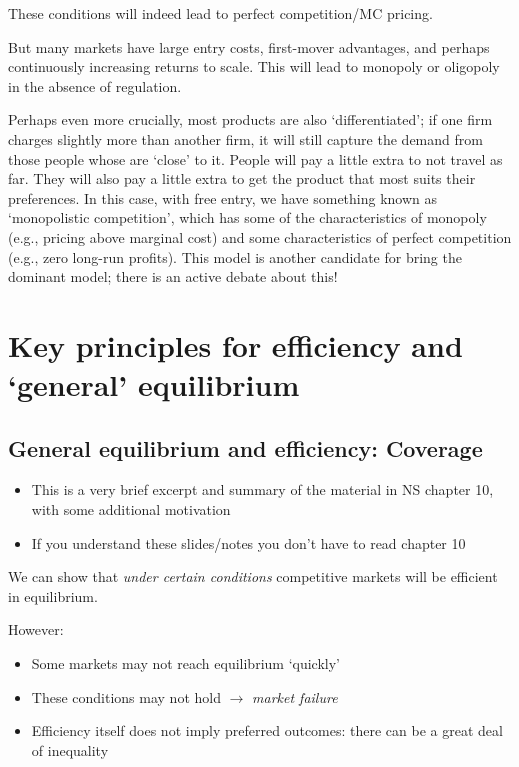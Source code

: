 \documentclass[]{article}
\providecommand{\tightlist}{%
  \setlength{\itemsep}{0pt}\setlength{\parskip}{0pt}}
\begin{document}
These conditions will indeed lead to perfect competition/MC pricing.

But many markets have large entry costs, first-mover advantages, and
perhaps continuously increasing returns to scale. This will lead to
monopoly or oligopoly in the absence of regulation.

Perhaps even more crucially, most products are also `differentiated'; if
one firm charges slightly more than another firm, it will still capture
the demand from those people whose are `close' to it. People will pay a
little extra to not travel as far. They will also pay a little extra to
get the product that most suits their preferences. In this case, with
free entry, we have something known as `monopolistic competition', which
has some of the characteristics of monopoly (e.g., pricing above
marginal cost) and some characteristics of perfect competition (e.g.,
zero long-run profits). This model is another candidate for bring the
dominant model; there is an active debate about this!

\bigskip

\hypertarget{key-principles-for-efficiency-and-general-equilibrium}{%
\section{Key principles for efficiency and `general'
equilibrium}\label{key-principles-for-efficiency-and-general-equilibrium}}

\hypertarget{general-equilibrium-and-efficiency-coverage}{%
\subsection{General equilibrium and efficiency:
Coverage}\label{general-equilibrium-and-efficiency-coverage}}

\begin{itemize}
\tightlist
\item
  This is a very brief excerpt and summary of the material in NS chapter
  10, with some additional motivation
\item
  If you understand these slides/notes you don't have to read chapter 10
\end{itemize}

We can show that \emph{under certain conditions} competitive markets
will be efficient in equilibrium.

However:

\begin{itemize}
\item
  Some markets may not reach equilibrium `quickly'
\item
  These conditions may not hold \(\rightarrow\) \emph{market failure}
\item
  Efficiency itself does not imply preferred outcomes: there can be a
  great deal of inequality
\end{itemize}
\end{document}
